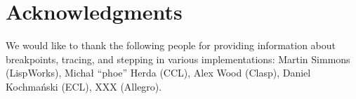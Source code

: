 \section{Acknowledgments} 

We would like to thank the following people for providing information
about breakpoints, tracing, and stepping in various \commonlisp{}
implementations: Martin Simmons (LispWorks), Michał ``phoe'' Herda
(CCL), Alex Wood (Clasp), Daniel Kochmański (ECL), XXX (Allegro).

